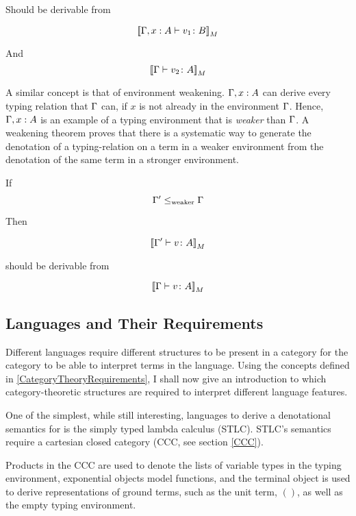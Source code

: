 \documentclass{Report}
\begin{document}
Should be derivable from

\begin{equation}
    {\bf [\![}\Gamma, x: A \vdash v_1 \colon B{\bf ]\!]}_M
\end{equation}

And  \begin{equation}
    {\bf [\![}\Gamma \vdash v_2 \colon A{\bf ]\!]}_M
\end{equation}

A similar concept is that of environment weakening. $\Gamma, x: A$ can derive every typing relation that $\Gamma$ can, if $x$ is not already in the environment $\Gamma$. Hence, $\Gamma, x: A$ is an example of a typing environment that is \textit{weaker} than $\Gamma$. A weakening theorem proves that there is a systematic way to generate the denotation of a typing-relation on a term in a weaker  environment from the denotation of the same term in a stronger environment.

If \begin{equation}
    \Gamma' \leq_{\text{weaker}} \Gamma
\end{equation}

Then

\begin{equation}
    {\bf [\![}\Gamma' \vdash v \colon A{\bf ]\!]}_M
\end{equation}

should be derivable from

\begin{equation}
    {\bf [\![}\Gamma \vdash v \colon A{\bf ]\!]}_M
\end{equation}

\subsection{Languages and Their Requirements}
Different languages require different structures to be present in a category for the category to be able to interpret terms in the language. Using the concepts defined in \ref{CategoryTheoryRequirements}, I shall now give an introduction to which category-theoretic structures are required to interpret different language features. 

One of the simplest, while still interesting, languages to derive a denotational semantics for is the simply typed lambda calculus (STLC). STLC's semantics require a cartesian closed category (CCC, see section \ref{CCC}).

Products in the CCC are used to denote the lists of variable types in the typing environment, exponential objects model functions, and the terminal object is used to derive representations of ground terms, such as the unit term, $()$, as well as the empty typing environment.
\end{document}
